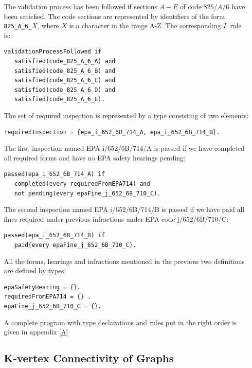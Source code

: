 \documentclass[a4paper,10pt]{article}
\begin{document}
\medskip\noindent
The validation process has been followed if sections $A-E$ of code  $825/A/6$ have been satisfied. The code sections are represented by identifiers of the form \texttt{825\_A\_6\_}$X$, where $X$ is a character in the range A-Z. The corresponding $L$ rule is:

\begin{verbatim}
validationProcessFollowed if
   satisfied(code_825_A_6_A) and
   satisfied(code_825_A_6_B) and
   satisfied(code_825_A_6_C) and
   satisfied(code_825_A_6_D) and
   satisfied(code_825_A_6_E).
\end{verbatim}


\medskip\noindent
The set of required inspection is represented by a type consisting of two elements:
\begin{verbatim}
requiredInspection = {epa_i_652_6B_714_A, epa_i_652_6B_714_B}.
\end{verbatim} 

\medskip\noindent
The first inspection named EPA i/652/6B/714/A is  passed if we have completed all 
   required forms and have no EPA safety hearings pending:

\begin{verbatim}
passed(epa_i_652_6B_714_A) if
   completed(every requiredFromEPA714) and
   not pending(every epaFine_j_652_6B_710_C).
\end{verbatim}

\medskip\noindent
The second inspection named  EPA i/652/6B/714/B is passed if we have paid all fines 
required under previous infractions under EPA code j/652/6B/710/C:

\begin{verbatim}
passed(epa_i_652_6B_714_B) if
   paid(every epaFine_j_652_6B_710_C).
\end{verbatim}

\medskip\noindent
All the forms, hearings and infractions mentioned in the previous two definitions are defined by types:

\begin{verbatim}
epaSafetyHearing = {}.
requiredFromEPA714 = {} .
epaFine_j_652_6B_710_C = {}.
\end{verbatim}

\medskip\noindent
A complete program with type declarations and rules put in the right order is given in appendix \ref{A}
   
\subsection{K-vertex Connectivity of Graphs}
\end{document}

